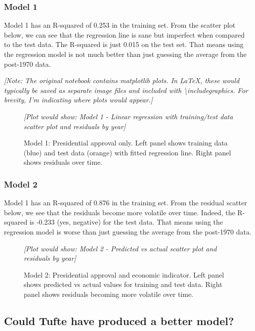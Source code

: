 \subsubsection{Model 1}

Model 1 has an R-squared of 0.253 in the training set. From the scatter plot below, we can see that the regression line is sane but imperfect when compared to the test data. The R-squared is just 0.015 on the test set. That means using the regression model is not much better than just guessing the average from the post-1970 data.

\textit{[Note: The original notebook contains matplotlib plots. In LaTeX, these would typically be saved as separate image files and included with \textbackslash includegraphics. For brevity, I'm indicating where plots would appear.]}

\begin{figure}[H]
\centering
\textit{[Plot would show: Model 1 - Linear regression with training/test data scatter plot and residuals by year]}
\caption{Model 1: Presidential approval only. Left panel shows training data (blue) and test data (orange) with fitted regression line. Right panel shows residuals over time.}
\end{figure}

\subsubsection{Model 2}

Model 1 has an R-squared of 0.876 in the training set. From the residual scatter below, we see that the residuals become more volatile over time. Indeed, the R-squared is -0.233 (yes, negative) for the test data. That means using the regression model is worse than just guessing the average from the post-1970 data.

\begin{figure}[H]
\centering
\textit{[Plot would show: Model 2 - Predicted vs actual scatter plot and residuals by year]}
\caption{Model 2: Presidential approval and economic indicator. Left panel shows predicted vs actual values for training and test data. Right panel shows residuals becoming more volatile over time.}
\end{figure}

\subsection{Could Tufte have produced a better model?}

